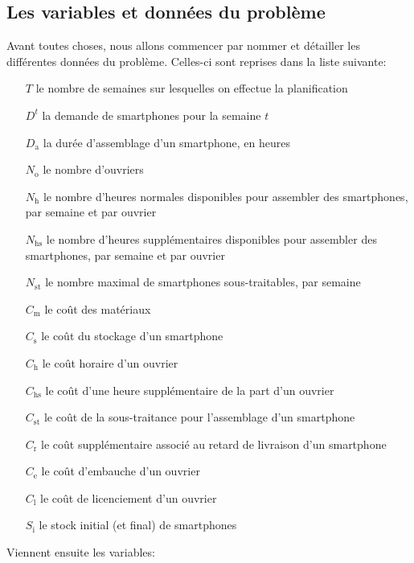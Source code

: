 \subsection*{Les variables et données du problème   }
Avant toutes choses, nous allons commencer par nommer et détailler les différentes données du problème. Celles-ci sont reprises dans la liste suivante:

\begin{itemize}[before={\renewcommand\makelabel[1]{\makebox[1cm][r]{##1\hspace{.2cm}}}}]
    \item[$T$] le nombre de semaines sur lesquelles on effectue la planification
    \item[$D^t$] la demande de smartphones pour la semaine $t$
    \item[$D_\mathrm{a}$] la durée d'assemblage d'un smartphone, en heures
    \item[$N_\mathrm{o}$] le nombre d'ouvriers
    \item[$N_\mathrm{h}$] le nombre d'heures normales disponibles pour assembler des smartphones, par semaine et par ouvrier
    \item[$N_\mathrm{hs}$] le nombre d'heures supplémentaires disponibles pour assembler des smartphones, par semaine et par ouvrier
    \item[$N_\mathrm{st}$] le nombre maximal de smartphones sous-traitables, par semaine 
    \item[$C_\mathrm{m}$] le coût des matériaux
    \item[$C_\mathrm{s}$] le coût du stockage d'un smartphone
    \item[$C_\mathrm{h}$] le coût horaire d'un ouvrier
    \item[$C_\mathrm{hs}$] le coût d'une heure supplémentaire de la part d'un ouvrier
    \item[$C_\mathrm{st}$] le coût de la sous-traitance pour l'assemblage d'un smartphone
    \item[$C_\mathrm{r}$] le coût supplémentaire associé au retard de livraison d'un smartphone
    \item[$C_\mathrm{e}$] le coût d'embauche d'un ouvrier
    \item[$C_\mathrm{l}$] le coût de licenciement d'un ouvrier
    \item[$S_\mathrm{i}$] le stock initial (et final) de smartphones
\end{itemize}

Viennent ensuite les variables:


